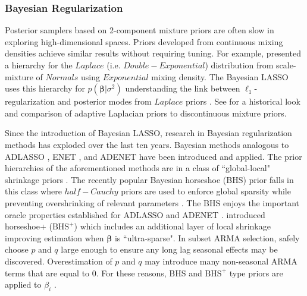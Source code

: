\subsubsection{Bayesian Regularization}
Posterior samplers based on 2-component mixture priors are often slow in exploring high-dimensional spaces. Priors developed from continuous mixing densities achieve similar results without requiring tuning. For example, \cite{Andrews1974} presented a hierarchy for the $Laplace$ (i.e. $Double-Exponential$) distribution from scale-mixture of $Normals$ using $Exponential$ mixing density. The Bayesian LASSO \citep{Park2008,Hans2009} uses this hierarchy for $p(\bm{\beta}|\sigma^2)$ understanding the link between $\ell_1$-regularization and posterior modes from $Laplace$ priors \citep{Tibshirani1996}. See \cite{OHara2009} for a historical look and comparison of adaptive Laplacian priors to discontinuous mixture priors.

Since the introduction of Bayesian LASSO, research in Bayesian regularization methods has exploded over the last ten years. Bayesian methods analogous to ADLASSO \citep{Leng2014}, ENET \citep{Li2010a}, and ADENET \citep{Stankiewicz2015} have been introduced and applied. The prior hierarchies of the aforementioned methods are in a class of ``global-local" shrinkage priors \citep{Polson2010}. The recently popular Bayesian horseshoe (BHS) prior falls in this class where $half-Cauchy$ priors are used to enforce global sparsity while preventing overshrinking of relevant parameters \citep{Carvalho2009,Carvalho2010}. The BHS enjoys the important oracle properties established for ADLASSO and ADENET \citep{Datta2015}. \cite{Bhadra2016} introduced horseshoe+ ($\textrm{BHS}^+$) which includes an additional layer of local shrinkage improving estimation when $\bm{\beta}$ is ``ultra-sparse". In subset ARMA selection, safely choose $p$ and $q$ large enough to ensure any long lag seasonal effects may be discovered. Overestimation of $p$ and $q$ may introduce many non-seasonal ARMA terms that are equal to 0.  For these reasons, BHS and $\textrm{BHS}^+$ type priors are applied to $\beta_i$ . 

